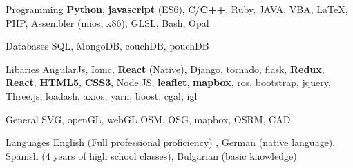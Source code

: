 

\begin{cvskills}

  \cvskill
    {Programming} %
    {\textbf{Python}, \textbf{javascript} (ES6), C/\textbf{C++}, Ruby, JAVA, VBA, LaTeX, PHP, Assembler (mios, x86), GLSL, Bash, Opal} %

  \cvskill
    {Databases} %
    {SQL, MongoDB, couchDB, pouchDB} %

  \cvskill
    {Libaries} %
    {AngularJs, Ionic, \textbf{React} (Native), Django, tornado, flask, \textbf{Redux}, \textbf{React}, \textbf{HTML5}, \textbf{CSS3}, Node.JS, \textbf{leaflet}, \textbf{mapbox}, ros, bootstrap, jquery, Three.js, loadash, axios, yarn, boost, cgal, igl} %
    
    
  \cvskill
    {General} %
    {SVG, openGL, webGL OSM, OSG, mapbox, OSRM, CAD} %

  \cvskill
    {Languages} %
    {English (Full professional proficiency) , German (native language), Spanish (4 years of high school classes), Bulgarian (basic knowledge)} %

\end{cvskills}
